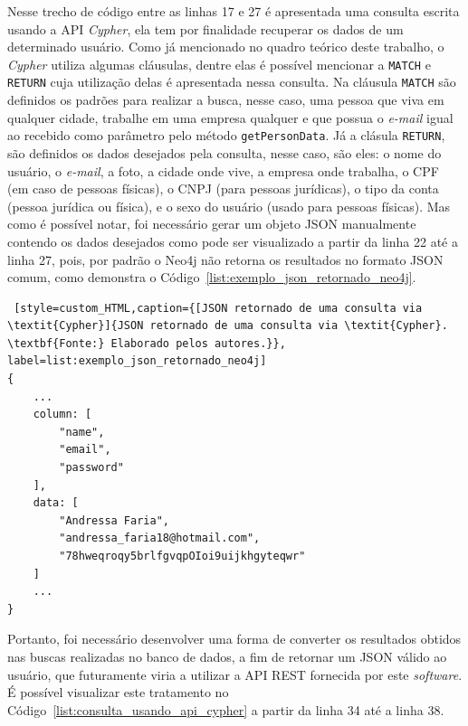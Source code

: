 
Nesse trecho de código entre as linhas 17 e 27 é apresentada uma consulta escrita usando a API \textit{Cypher}, ela tem por finalidade recuperar os dados de um determinado usuário. Como já mencionado no quadro teórico deste trabalho, o \textit{Cypher} utiliza algumas cláusulas, dentre elas é possível mencionar a \texttt{MATCH} e \texttt{RETURN} cuja utilização delas é apresentada nessa consulta. Na cláusula \texttt{MATCH} são definidos os padrões para realizar a busca, nesse caso, uma pessoa que viva em qualquer cidade, trabalhe em uma empresa qualquer e que possua o \textit{e-mail} igual ao recebido como parâmetro pelo método \texttt{getPersonData}. Já a clásula \texttt{RETURN}, são definidos os dados desejados pela consulta, nesse caso, são eles: o nome do usuário, o \textit{e-mail}, a foto, a cidade onde vive, a empresa onde trabalha, o CPF (em caso de pessoas físicas), o CNPJ (para pessoas jurídicas), o tipo da conta (pessoa jurídica ou física), e o sexo do usuário (usado para pessoas físicas). Mas como é possível notar, foi necessário gerar um objeto JSON manualmente contendo os dados desejados como pode ser visualizado a partir da linha 22 até a linha 27, pois, por padrão o Neo4j não retorna os resultados no formato JSON comum, como demonstra o Código~\ref{list:exemplo_json_retornado_neo4j}. 

\begin{lstlisting} [style=custom_HTML,caption={[JSON retornado de uma consulta via \textit{Cypher}]{JSON retornado de uma consulta via \textit{Cypher}. \textbf{Fonte:} Elaborado pelos autores.}}, label=list:exemplo_json_retornado_neo4j] 	
{
	...
	column: [
		"name",
		"email",
		"password"
	],
	data: [
		"Andressa Faria",
		"andressa_faria18@hotmail.com",
		"78hweqroqy5brlfgvqpOIoi9uijkhgyteqwr"
	]
	...
}
\end{lstlisting}

Portanto, foi necessário desenvolver uma forma de converter os resultados obtidos nas buscas realizadas no banco de dados, a fim de retornar um JSON válido ao usuário, que futuramente viria a utilizar a API REST fornecida por este \textit{software}. É possível visualizar este tratamento no Código~\ref{list:consulta_usando_api_cypher} a partir da linha 34 até a linha 38.

